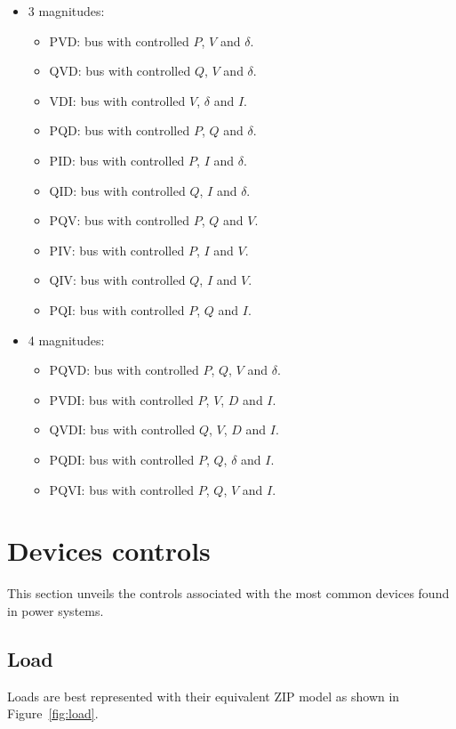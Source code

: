 \documentclass[11pt]{article}
\begin{document}
\begin{itemize}
\begin{itemize}
		\end{itemize}
		\item 3 magnitudes:
		\begin{itemize}
			\item PVD: bus with controlled $P$, $V$ and $\delta$.
			\item QVD: bus with controlled $Q$, $V$ and $\delta$.
			\item VDI: bus with controlled $V$, $\delta$ and $I$.
			\item PQD: bus with controlled $P$, $Q$ and $\delta$.
			\item PID: bus with controlled $P$, $I$ and $\delta$.
			\item QID: bus with controlled $Q$, $I$ and $\delta$.
			\item PQV: bus with controlled $P$, $Q$ and $V$.
			\item PIV: bus with controlled $P$, $I$ and $V$.
			\item QIV: bus with controlled $Q$, $I$ and $V$.
			\item PQI: bus with controlled $P$, $Q$ and $I$.
		\end{itemize}
		\item 4 magnitudes:
		\begin{itemize}
			\item PQVD: bus with controlled $P$, $Q$, $V$ and $\delta$.
			\item PVDI: bus with controlled $P$, $V$, $D$ and $I$.
			\item QVDI: bus with controlled $Q$, $V$, $D$ and $I$.
			\item PQDI: bus with controlled $P$, $Q$, $\delta$ and $I$.
			\item PQVI: bus with controlled $P$, $Q$, $V$ and $I$.
		\end{itemize}
	\end{itemize}



	\section{Devices controls}
	This section unveils the controls associated with the most common devices found in power systems.

	\subsection{Load}
	Loads are best represented with their equivalent ZIP model as shown in Figure~\ref{fig:load}.
\end{document}

